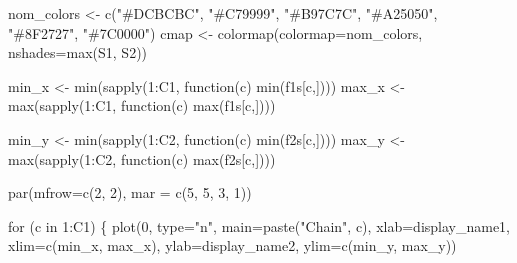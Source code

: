 \documentclass[
  letterpaper,
  DIV=11,
  numbers=noendperiod]{scrartcl}
\newenvironment{Shaded}{\begin{snugshade}}{\end{snugshade}}
\newcommand{\AttributeTok}[1]{\textcolor[rgb]{0.40,0.45,0.13}{#1}}
\newcommand{\ControlFlowTok}[1]{\textcolor[rgb]{0.00,0.23,0.31}{#1}}
\newcommand{\DecValTok}[1]{\textcolor[rgb]{0.68,0.00,0.00}{#1}}
\newcommand{\FunctionTok}[1]{\textcolor[rgb]{0.28,0.35,0.67}{#1}}
\newcommand{\NormalTok}[1]{\textcolor[rgb]{0.00,0.23,0.31}{#1}}
\newcommand{\OtherTok}[1]{\textcolor[rgb]{0.00,0.23,0.31}{#1}}
\newcommand{\SpecialCharTok}[1]{\textcolor[rgb]{0.37,0.37,0.37}{#1}}
\newcommand{\StringTok}[1]{\textcolor[rgb]{0.13,0.47,0.30}{#1}}
\begin{document}
\begin{Shaded}
\begin{Highlighting}[]
\NormalTok{  nom\_colors }\OtherTok{\textless{}{-}} \FunctionTok{c}\NormalTok{(}\StringTok{"\#DCBCBC"}\NormalTok{, }\StringTok{"\#C79999"}\NormalTok{, }\StringTok{"\#B97C7C"}\NormalTok{,}
                  \StringTok{"\#A25050"}\NormalTok{, }\StringTok{"\#8F2727"}\NormalTok{, }\StringTok{"\#7C0000"}\NormalTok{)}
\NormalTok{  cmap }\OtherTok{\textless{}{-}} \FunctionTok{colormap}\NormalTok{(}\AttributeTok{colormap=}\NormalTok{nom\_colors, }\AttributeTok{nshades=}\FunctionTok{max}\NormalTok{(S1, S2))}

\NormalTok{  min\_x }\OtherTok{\textless{}{-}} \FunctionTok{min}\NormalTok{(}\FunctionTok{sapply}\NormalTok{(}\DecValTok{1}\SpecialCharTok{:}\NormalTok{C1, }\ControlFlowTok{function}\NormalTok{(c) }\FunctionTok{min}\NormalTok{(f1s[c,])))}
\NormalTok{  max\_x }\OtherTok{\textless{}{-}} \FunctionTok{max}\NormalTok{(}\FunctionTok{sapply}\NormalTok{(}\DecValTok{1}\SpecialCharTok{:}\NormalTok{C1, }\ControlFlowTok{function}\NormalTok{(c) }\FunctionTok{max}\NormalTok{(f1s[c,])))}

\NormalTok{  min\_y }\OtherTok{\textless{}{-}} \FunctionTok{min}\NormalTok{(}\FunctionTok{sapply}\NormalTok{(}\DecValTok{1}\SpecialCharTok{:}\NormalTok{C2, }\ControlFlowTok{function}\NormalTok{(c) }\FunctionTok{min}\NormalTok{(f2s[c,])))}
\NormalTok{  max\_y }\OtherTok{\textless{}{-}} \FunctionTok{max}\NormalTok{(}\FunctionTok{sapply}\NormalTok{(}\DecValTok{1}\SpecialCharTok{:}\NormalTok{C2, }\ControlFlowTok{function}\NormalTok{(c) }\FunctionTok{max}\NormalTok{(f2s[c,])))}

  \FunctionTok{par}\NormalTok{(}\AttributeTok{mfrow=}\FunctionTok{c}\NormalTok{(}\DecValTok{2}\NormalTok{, }\DecValTok{2}\NormalTok{), }\AttributeTok{mar =} \FunctionTok{c}\NormalTok{(}\DecValTok{5}\NormalTok{, }\DecValTok{5}\NormalTok{, }\DecValTok{3}\NormalTok{, }\DecValTok{1}\NormalTok{))}

  \ControlFlowTok{for}\NormalTok{ (c }\ControlFlowTok{in} \DecValTok{1}\SpecialCharTok{:}\NormalTok{C1) \{}
    \FunctionTok{plot}\NormalTok{(}\DecValTok{0}\NormalTok{, }\AttributeTok{type=}\StringTok{"n"}\NormalTok{, }\AttributeTok{main=}\FunctionTok{paste}\NormalTok{(}\StringTok{"Chain"}\NormalTok{, c),}
         \AttributeTok{xlab=}\NormalTok{display\_name1, }\AttributeTok{xlim=}\FunctionTok{c}\NormalTok{(min\_x, max\_x),}
         \AttributeTok{ylab=}\NormalTok{display\_name2, }\AttributeTok{ylim=}\FunctionTok{c}\NormalTok{(min\_y, max\_y))}
  

\end{Highlighting}
\end{Shaded}
\end{document}
